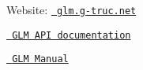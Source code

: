 
\begin{DoxyItemize}
\item Website\+: \href{https://glm.g-truc.net}{\texttt{ glm.\+g-\/truc.\+net}}
\item \href{modules.html}{\texttt{ G\+LM A\+PI documentation}}
\item \href{https://github.com/g-truc/glm/blob/master/manual.md}{\texttt{ G\+LM Manual}} 
\end{DoxyItemize}